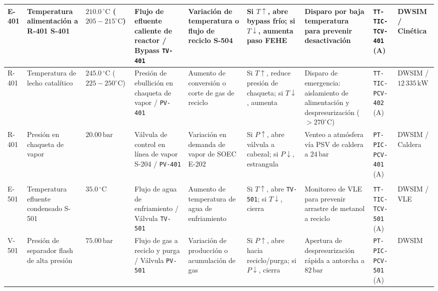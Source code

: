 \documentclass[10pt,letterpaper]{article}
\begin{document}
\begin{landscape}
\begin{longtable}{|p{1.4cm}|p{2.3cm}|p{2.0cm}|p{2.9cm}|p{2.8cm}|p{3.0cm}|p{3.4cm}|p{2.5cm}|p{1.5cm}|}
E-401 & Temperatura alimentación a R-401 S-401 & $210.0\,^\circ\text{C}$ ($205-215^\circ\text{C}$) & Flujo de efluente caliente de reactor / Bypass \texttt{TV-401} & Variación de temperatura o flujo de reciclo S-504 & Si $T \uparrow$, abre bypass frío; si $T \downarrow$, aumenta paso FEHE & Disparo por baja temperatura para prevenir desactivación & \texttt{TT-TIC-TCV-401} (A) & DWSIM / Cinética \\ \hline

R-401 & Temperatura de lecho catalítico & $245.0\,^\circ\text{C}$ ($225-250^\circ\text{C}$) & Presión de ebullición en chaqueta de vapor / \texttt{PV-401} & Aumento de conversión o corte de gas de reciclo & Si $T \uparrow$, reduce presión de chaqueta; si $T \downarrow$, aumenta & Disparo de emergencia: aislamiento de alimentación y despresurización ($>270^\circ\text{C}$) & \texttt{TT-TIC-PCV-402} (A) & DWSIM / $12\,335\,\text{kW}$ \\ \hline

R-401 & Presión en chaqueta de vapor & $20.00\,\text{bar}$ & Válvula de control en línea de vapor S-204 / \texttt{PV-401} & Variación en demanda de vapor de SOEC E-202 & Si $P \uparrow$, abre válvula a cabezal; si $P \downarrow$, estrangula & Venteo a atmósfera vía PSV de caldera a $24\,\text{bar}$ & \texttt{PT-PIC-PCV-401} (A) & DWSIM / Caldera \\ \hline

\rowcolor{tablerowalt}\multicolumn{9}{|l|}{\textbf{\color{navyblue}Área 500: Recuperación Térmica, Separación Flash HP y Reciclo}} \\ \hline

E-501 & Temperatura efluente condensado S-501 & $35.0\,^\circ\text{C}$ & Flujo de agua de enfriamiento / Válvula \texttt{TV-501} & Aumento de temperatura de agua de enfriamiento & Si $T \uparrow$, abre \texttt{TV-501}; si $T \downarrow$, cierra & Monitoreo de VLE para prevenir arrastre de metanol a reciclo & \texttt{TT-TIC-TCV-501} (A) & DWSIM / VLE \\ \hline

V-501 & Presión de separador flash de alta presión & $75.00\,\text{bar}$ & Flujo de gas a reciclo y purga / Válvula \texttt{PV-501} & Variación de producción o acumulación de gas & Si $P \uparrow$, abre hacia reciclo/purga; si $P \downarrow$, cierra & Apertura de despresurización rápida a antorcha a $82\,\text{bar}$ & \texttt{PT-PIC-PCV-501} (A) & DWSIM \\ \hline


\end{longtable}
\end{landscape}
\end{document}
